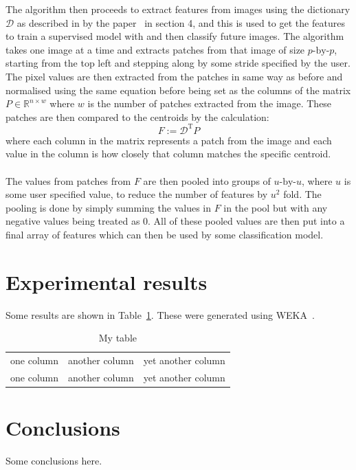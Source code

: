 \documentclass{article}
\begin{document}
The algorithm then proceeds to extract features from images using the dictionary $\mathcal{D}$ as described in by the paper~\cite{paper} in section 4, and this is used to get the features to train a supervised model with and then classify future images. The algorithm takes one image at a time and extracts patches from that image of size $p\textrm{-by-}p$, starting from the top left and stepping along by some stride specified by the user. The pixel values are then extracted from the patches in same way as before and normalised using the same equation before being set as the columns of the matrix $P \in \mathbb{R}^{n \times w}$ where $w$ is the number of patches extracted from the image. These patches are then compared to the centroids by the calculation:
\[
F := \mathcal{D}^{\mathrm{T}}P
\]
where each column in the matrix represents a patch from the image and each value in the column is how closely that column matches the specific centroid.

\paragraph{}

The values from patches from $F$ are then pooled into groups of $u\textrm{-by-}u$, where $u$ is some user specified value, to reduce the number of features by $u^2$ fold. The pooling is done by simply summing the values in $F$ in the pool but with any negative values being treated as 0. All of these pooled values are then put into a final array of features which can then be used by some classification model.

\section{Experimental results}

Some results are shown in Table~\ref{table_ref}. These were generated using WEKA~\cite{weka}.

\begin{table}[h]
\footnotesize
\center
\begin{tabular}{|c|c|c|}
\hline
one column & another column & yet another column\\
one column & another column & yet another column\\
\hline
\end{tabular}
\caption{My table}
\label{table_ref}
\end{table}

\section{Conclusions}

Some conclusions here.



\end{document}
